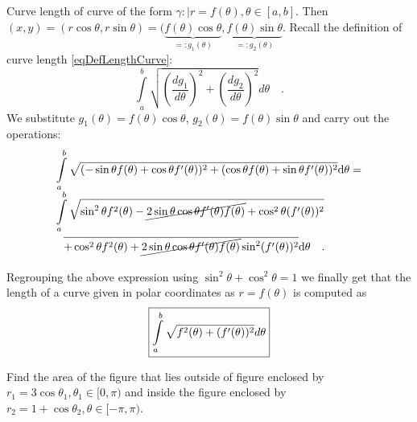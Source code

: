 \documentclass[12pt]{book}
\newcommand{\importantFormula}[1]{\begin{equation} \boxed{#1} \end{equation}}
\begin{document}
Curve length of curve of the form $\gamma:|r=f(\theta),\theta\in [a,b]$. Then $(x,y)= (r\cos\theta, r\sin \theta)= (\underbrace{f(\theta)\cos\theta}_{=:g_1(\theta)}, \underbrace{ f(\theta)\sin\theta}_{=:g_2(\theta)} $. Recall the definition of curve length \eqref{eqDefLengthCurve}:
\[
\int\limits_{a}^b\sqrt{\left(\frac{dg_1}{d\theta}\right)^2+\left(\frac{dg_2}{d\theta}\right)^2}d\theta \quad.
\]
We substitute $g_1(\theta)=f(\theta)\cos\theta$, $g_2(\theta)=f(\theta)\sin\theta$ and carry out the operations:
\[
\begin{array}{l}
\displaystyle\int\limits_{a}^b\sqrt{ (-\sin\theta f(\theta) + \cos\theta f'(\theta) )^2+(\cos\theta f(\theta)+\sin \theta f'(\theta) )^2}{\normalfont \text{d}}\theta=\\
\displaystyle \int \limits_{a}^b \sqrt{\sin^2\theta f^2(\theta)- \cancel{2\sin\theta\cos\theta f'(\theta)f(\theta)}+\cos^2\theta (f'(\theta))^2}\\
\phantom{\int\limits_a^b} \overline{+ \cos^2\theta f^2(\theta)+\cancel{2\sin\theta\cos\theta f'(\theta)f(\theta)} \sin^2 (f'(\theta))^2 }{\normalfont \text{d}}\theta\quad .
\end{array}
\]
Regrouping the above expression using $\sin^2\theta+\cos^2\theta=1$ we finally get that the length of a curve given in polar coordinates as $r=f(\theta)$ is computed as
\importantFormula{\label{eqCurveLengthPolarCoords}
\int\limits_{a}^b \sqrt{f^2(\theta)+ (f'(\theta))^2}d\theta
}

Find the area of the figure that lies outside of figure enclosed by $r_1=3\cos\theta_1, \theta_1\in [0,\pi)$ and inside the figure enclosed by $r_2=1+\cos\theta_2, \theta\in [-\pi,\pi)$. %
\end{document}
